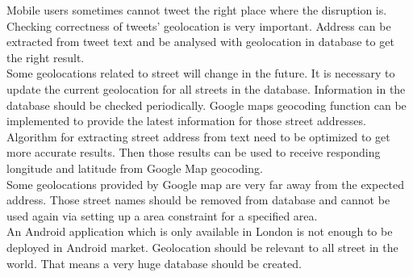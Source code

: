 Mobile users sometimes cannot tweet the right place where the disruption is. Checking correctness of tweets' geolocation is very important. Address can be extracted from tweet text and be analysed with geolocation in database to get the right result.\\
Some geolocations related to street will change in the future. It is necessary to update the current geolocation for all streets in the database. Information in the database should be checked periodically. Google maps geocoding function can be implemented to provide the latest information for those street addresses.\\
Algorithm for extracting street address from text need to be optimized to get more accurate results. Then those results can be used to receive responding longitude and latitude from Google Map geocoding.\\
Some geolocations provided by Google map are very far away from the expected address. Those street names should be removed from database and cannot be used again via setting up a area constraint for a specified area.\\
An Android application which is only available in London is not enough to be deployed in Android market. Geolocation should be relevant to all street in the world. That means a very huge database should be created.\\
